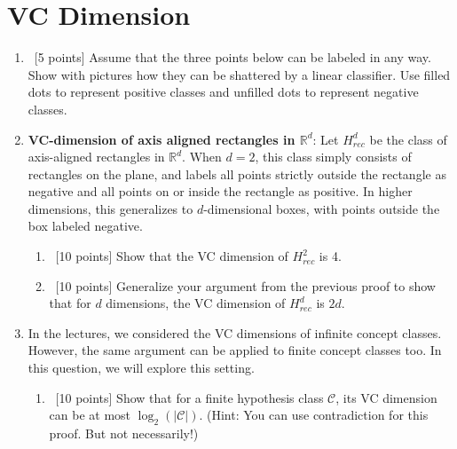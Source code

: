 \section{VC Dimension}
\label{sec:vc-dimension}
\begin{enumerate}
\item ~[5 points] Assume that the three points below can be labeled
  in any way.  Show with pictures how they can be shattered by a
  linear classifier.  Use filled dots to represent positive classes
  and unfilled dots to represent negative classes.


  
\item {\bf VC-dimension of axis aligned rectangles in $\mathbb{R}^d$}:
  Let $H^d_{rec}$ be the class of axis-aligned rectangles in
  $\mathbb{R}^d$. When $d=2$, this class simply consists of rectangles
  on the plane, and labels all points strictly outside the rectangle
  as negative and all points on or inside the rectangle as positive.
  In higher dimensions, this generalizes to $d$-dimensional boxes,
  with points outside the box labeled negative.

  \begin{enumerate}
  \item ~[10 points] Show that the VC dimension of $H^2_{rec}$ is 4.
  \item ~[10 points] Generalize your argument from the previous proof
    to show that for $d$ dimensions, the VC dimension of $H^d_{rec}$
    is $2d$.
  \end{enumerate}
  
\item In the lectures, we considered the VC dimensions of infinite
  concept classes. However, the same argument can be applied to finite
  concept classes too. In this question, we will explore this setting.

  \begin{enumerate}
  \item ~[10 points] Show that for a finite hypothesis class
    $\mathcal{C}$, its VC dimension can be at most
    $\log_2\left(|\mathcal{C}|\right)$. (Hint: You can use
    contradiction for this proof. But not necessarily!)


\end{enumerate}
\end{enumerate}
